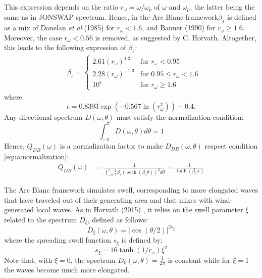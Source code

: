 \documentclass[11pt]{article}
\def\Framework{The Arc Blanc framework\xspace}
\def\framework{the Arc Blanc framework\xspace}
\def\etal{\emph{et al.}\xspace}
\begin{document}
This expression depends on the ratio $r_{\omega}=\omega/\omega_p$ of $\omega$ and $\omega_p$, the latter being the same as in JONSWAP spectrum.
Hence, in \framework $\beta_s$ is defined as a mix of Donelan \etal (1985) \cite{donelanDirectionalSpectraWindgenerated1985} for $r_{\omega}<1.6$, and Banner (1990) \cite{bannerEquilibriumSpectraWind1990} for $r_{\omega}\geq1.6$.
Moreover, the case $r_{\omega}<0.56$ is removed, as suggested by C. Horvath.
Altogether, this leads to the following expression of $\beta_s$:
\begin{equation}
	\begin{aligned}
		 & \beta_s= \begin{cases}%
			            2.61\left(r_{\omega}\right)^{1.3}  & \text{for } r_{\omega}<0.95          \\
			            2.28\left(r_{\omega}\right)^{-1.3} & \text{for } 0.95 \leq r_{\omega}<1.6 \\
			            10^\epsilon                        & \text{for }  r_{\omega}\geq1.6       %
		            \end{cases}
	\end{aligned}
\end{equation}
where
\begin{equation}
	\epsilon=0.8393 \exp \left(-0.567\ln\left(r_{\omega}^2\right)\right)-0.4.
\end{equation}
Any directional spectrum $D(\omega,\theta)$ must satisfy the normalization condition:
\begin{equation}
	\label{equa:normalization}
	\int_{-\pi}^\pi D(\omega,\theta)d\theta = 1
\end{equation}
Hence, $Q_{DB}(\omega)$ is a normalization factor to make $D_{DB}(\omega, \theta)$ respect condition \ref{equa:normalization}:
\begin{equation}
	\begin{aligned}
		Q_{DB}(\omega) & = \frac{1}{\displaystyle\int_{-\pi}^\pi \frac{1}{2}\beta_s\left(\operatorname{sech}\left(\beta_s \theta\right)\right)^2 d\theta} = \frac{1}{\tanh\left(\beta_s\pi\right)}
	\end{aligned}
\end{equation}


\Framework simulates swell, corresponding to more elongated waves that have traveled out of their generating area and that mixes with wind-generated local waves.
As in Horvath (2015) \cite{horvathEmpiricalDirectionalWave2015}, it relies on the swell parameter $\xi$ related to the spectrum $D_{\xi}$, defined as follows:
\begin{equation}
	D_{\xi}(\omega, \theta)=|\cos (\theta / 2)|^{2 s_{\xi}}
\end{equation}
where the spreading swell function $s_\xi$ is defined by:
\begin{equation}
	s_\xi = 16 \tanh(1 / r_\omega) \xi^2
\end{equation}
Note that, with $\xi=0$, the spectrum $D_{0}(\omega, \theta)=\frac{1}{2\pi}$ is constant while for $\xi=1$ the waves become much more elongated.
\end{document}
